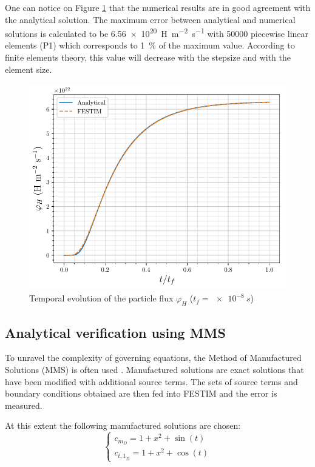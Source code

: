 One can notice on Figure \ref{fig:FESTIM vs analytical} that the numerical results are in good agreement with the analytical solution.
The maximum error between analytical and numerical solutions is calculated to be \SI{6.56e20}{H.m^{-2}.s^{-1}} with 50000 piecewise linear elements (P1) which corresponds to \SI{1}{\%} of the maximum value.
According to finite elements theory, this value will decrease with the stepsize and with the element size.
\begin{figure}
    \centering
    \includegraphics[width=\linewidth]{Figures/Chapter3/FESTIM_vs_analytical.pdf}
    \caption{Temporal evolution of the particle flux $\varphi_H$ ($t_f = \SI{e-8}{s}$)}
    \label{fig:FESTIM vs analytical}
\end{figure}
\subsection{Analytical verification using MMS} \label{mms}

To unravel the complexity of governing equations, the Method of Manufactured Solutions (MMS) is often used .
Manufactured solutions are exact solutions that have been modified with additional source terms.
The sets of source terms and boundary conditions obtained are then fed into FESTIM and the error is measured.


At this extent the following manufactured solutions are chosen:
\begin{equation}
    \begin{cases}
    c_{m_D} = 1 + x^2 + \sin(t) \\
    c_{{t,1}_D} = 1 + x^2 + \cos(t)
    \end{cases}
    \label{eq: manufactured solutions}
\end{equation}

